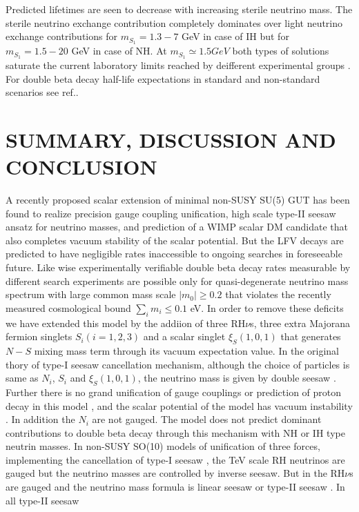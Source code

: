 \documentclass[a4paper,11pt]{article}
\begin{document}
Predicted lifetimes are seen to decrease with increasing sterile
neutrino mass. The sterile neutrino exchange contribution completely
dominates over light neutrino
exchange contributions for 
$m_{S_1}=1.3-7$ GeV in case of IH but for $m_{S_1}=1.5-20$ GeV in case of NH.  
At $m_{S_1}\simeq 1.5 GeV$ both types of solutions saturate the
current laboratory limits reached by deifferent experimental
groups . For double beta decay half-life expectations in standard and
non-standard scenarios see  ref.\cite{Rodejohann}. 

  




\section{SUMMARY, DISCUSSION AND CONCLUSION}\label{sec:sum}
A recently proposed scalar extension of minimal non-SUSY SU(5) GUT
has been found to realize  precision gauge coupling unification, high
scale type-II seesaw ansatz for neutrino masses, and prediction of  a
WIMP scalar DM candidate that also completes vacuum stability of the
scalar potential. But the LFV decays are predicted to have negligible
rates inaccessible to ongoing searches in foreseeable future. Like
wise experimentally verifiable double beta decay rates measurable by
different search experiments are possible only for quasi-degenerate
neutrino mass spectrum with large common mass scale $|m_0| \ge 0.2$
that violates the recently measured cosmological bound $\sum_i m_i \le
0.1$ eV. In order to remove these deficits we have extended this model
by the addiion of three RH$\nu$s, three extra Majorana fermion
singlets $S_i(i=1,2,3)$ and a scalar singlet $\xi_S(1,0,1)$ that
generates $N-S$ mixing mass term through its vacuum expectation
value. In the original thory  of type-I seesaw cancellation mechanism,
although the choice of particles is same as $N_i$, $S_i$ and
$\xi_S(1,0,1)$,  the neutrino mass is given by double seesaw
\cite{Kim-Kang:2006}. Further there is no grand unification of gauge couplings or prediction of proton decay in this model \cite{Kim-Kang:2006}, and the scalar potential of the model has vacuum instability . In addition the  
 $N_i$ are not gauged. The model does not  predict dominant contributions to double beta decay through this mechanism with NH or IH type 
neutrin masses. In non-SUSY  SO(10) models of unification of three forces,
 implementing  the cancellation of type-I seesaw \cite{mkp-bs:2015,app:2013,pas:2014}, the TeV scale RH neutrinos are gauged but the neutrino masses are controlled by inverse seesaw. But in \cite{nurev:mkpbpn,bpn-mkp:2015} the RH$\nu$s are gauged and the neutrino mass formula is linear seesaw or type-II seesaw \cite{nurev:mkpbpn}.  In all type-II seesaw
\end{document}
